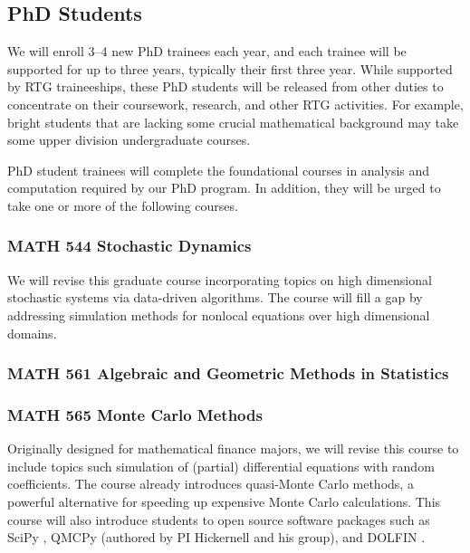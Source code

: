\documentclass[11pt]{NSFamsart}
\begin{document}
\subsection*{PhD Students}


We will enroll 3--4 new PhD trainees each year, and each trainee will be supported for up to three years, typically their first three year.  While supported by RTG traineeships, these PhD students will be released from other duties to concentrate on their coursework, research, and other RTG activities.  For example, bright students that are lacking some crucial mathematical background may take some upper division undergraduate courses.  

PhD student trainees will complete the foundational courses in analysis and computation required by our PhD program.  In addition, they will be urged to take one or more of the following courses.

\subsubsection*{MATH 544 Stochastic Dynamics}
We will revise this graduate course  incorporating topics on  high dimensional stochastic systems via data-driven algorithms.  The course will fill a gap by addressing simulation methods for nonlocal equations over high dimensional domains.

\subsubsection*{MATH 561 Algebraic and Geometric Methods in Statistics} 

\subsubsection*{MATH 565 Monte Carlo Methods} Originally designed for mathematical finance majors, we will revise this course to include topics such simulation of (partial) differential equations with random coefficients.  The course already introduces quasi-Monte Carlo methods, a powerful alternative for speeding up expensive Monte Carlo calculations.  This course will also introduce students to open source software packages such as SciPy \cite{virtanen2020scipy}, QMCPy \cite{QMCPy2020a} (authored by PI Hickernell and his group), and DOLFIN \cite{Dolphin12}. 
\end{document}
